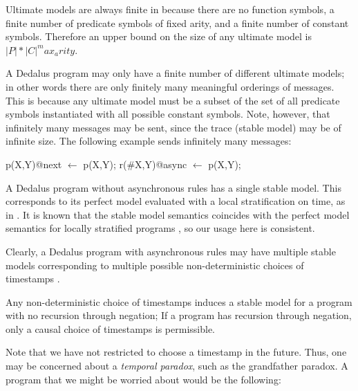 Ultimate models are always finite in \dedalus because there are no function symbols, a finite number of predicate symbols of fixed arity, and a finite number of constant symbols.  Therefore an upper bound on the size of any ultimate model is $|P| * |C| ^ max_arity$.

A Dedalus program may only have a finite number of different ultimate models; in other words there are only finitely many meaningful orderings of messages.  This is because any ultimate model must be a subset of the set of all predicate symbols instantiated with all possible constant symbols.  Note, however, that infinitely many messages may be sent, since the trace (stable model) may be of infinite size.  The following example sends infinitely many messages:

\begin{example}
\begin{Dedalus}
p(X,Y)@next \(\leftarrow\) p(X,Y);
r(#X,Y)@async \(\leftarrow\) p(X,Y);
\end{Dedalus}
\end{example}

A Dedalus program without asynchronous rules has a single stable model.  This corresponds to its perfect model evaluated with a local stratification on time, as in .  It is known that the stable model semantics coincides with the perfect model semantics for locally stratified programs , so our usage here is consistent.

Clearly, a Dedalus program with asynchronous rules may have multiple stable models corresponding to multiple possible non-deterministic choices of timestamps .


\begin{lemma}
Any non-deterministic choice of timestamps induces a stable model for a \lang program with no recursion through negation; If a \lang program has recursion through negation, only a causal choice of timestamps is permissible.
\end{lemma}

Note that we have not restricted  to choose a timestamp in the future.  Thus, one may be concerned about a {\em temporal paradox}, such as the grandfather paradox.  A program that we might be worried about would be the following:

